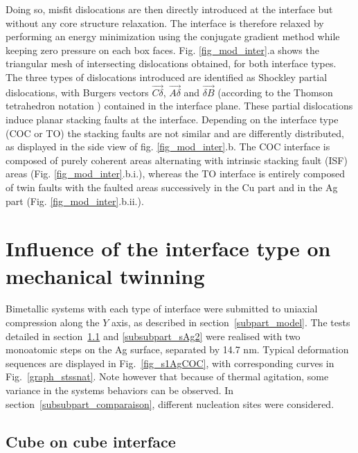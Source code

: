 \documentclass[final,3p,times,twocolumn]{elsarticle}
\begin{document}
Doing so, misfit dislocations are then directly introduced at the interface but without any core structure relaxation. The interface is therefore relaxed by performing an energy minimization using the conjugate gradient method while keeping zero pressure on each box faces. Fig. \ref{fig_mod_inter}.a shows the triangular mesh of intersecting dislocations obtained, for both interface types. The three types of dislocations introduced are identified as Shockley partial dislocations, with Burgers vectors $\overrightarrow{C\delta}$, $\overrightarrow{A\delta}$ and $\overrightarrow{\delta B}$ (according to the Thomson tetrahedron notation  \cite{hirth82book}) contained in the interface plane. These partial dislocations induce planar stacking faults at the interface. Depending on the interface type (COC or TO) the stacking faults are not similar and are differently distributed, as displayed in the side view of fig. \ref{fig_mod_inter}.b. The COC interface is composed of purely coherent areas alternating with intrinsic stacking fault (ISF) areas (Fig. \ref{fig_mod_inter}.b.i.), whereas the TO interface is entirely composed of twin faults with the faulted areas successively in the Cu part and in the Ag part (Fig. \ref{fig_mod_inter}.b.ii.).

\section{Influence of the interface type on mechanical twinning}
\label{part_influence}

Bimetallic systems with each type of interface were submitted to uniaxial compression along the $Y$ axis, as described in section~\ref{subpart_model}. The tests detailed in section~\ref{subsubpart_sAg} and \ref{subsubpart_sAg2} were realised with two monoatomic steps on the Ag surface, separated by 14.7 nm. 
Typical deformation sequences are displayed in Fig.~\ref{fig_s1AgCOC}, with corresponding curves in Fig.~\ref{graph_stssnat}. Note however that because of thermal agitation, some variance in the systems behaviors can be observed.
In section~\ref{subsubpart_comparaison}, different nucleation sites were considered.

 
	\subsection{Cube on cube interface}\label{subsubpart_sAg}
\end{document}
